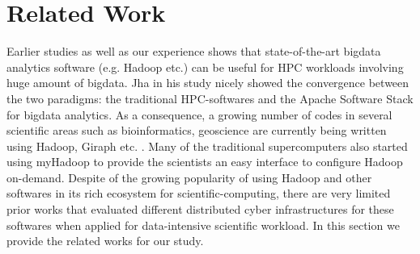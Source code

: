 \documentclass[conference]{IEEEtran}
\begin{document}
\section {Related Work} \label{Related Work}
Earlier studies \cite{schadoop:fadika} \cite{schadoop:jha} as well as our experience shows that state-of-the-art bigdata analytics software (e.g. Hadoop etc.) can be useful for HPC workloads involving huge amount of bigdata.
Jha \cite{schadoop:jha} in his study nicely showed the convergence between the two paradigms: the traditional HPC-softwares and the Apache Software Stack for bigdata analytics.
As a consequence, a growing number of codes in several scientific areas such as bioinformatics, geoscience are currently being written using Hadoop, Giraph etc. \cite{fw:myhadoop}.
Many of the traditional supercomputers also started using myHadoop \cite{fw:myhadoop} to provide the scientists an easy interface to configure Hadoop on-demand. 
Despite of the growing popularity of using Hadoop and other softwares in its rich ecosystem for scientific-computing, there are very limited prior works that evaluated different distributed cyber infrastructures for these softwares when applied for data-intensive scientific workload.
In this section we provide the related works for our study.

\end{document}
